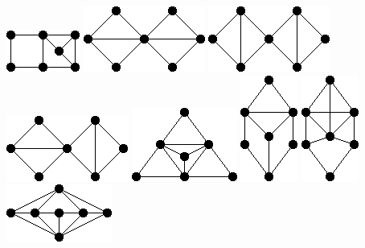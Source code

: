\documentclass[11pt,paper=b5,footinclude,headinclude]{scrbook} %
\begin{document}
\includegraphics[scale=0.5,frame]{smallGraphs/g_X10.png}     
\includegraphics[scale=0.5,frame]{smallGraphs/g_X100.png}     
\includegraphics[scale=0.5,frame]{smallGraphs/g_X101.png}     
\includegraphics[scale=0.5,frame]{smallGraphs/g_X102.png}     
\includegraphics[scale=0.5,frame]{smallGraphs/g_X103.png}     
\includegraphics[scale=0.5,frame]{smallGraphs/g_X104.png}     
\includegraphics[scale=0.5,frame]{smallGraphs/g_X105.png}     
\includegraphics[scale=0.5,frame]{smallGraphs/g_X106.png}     
\end{document}
